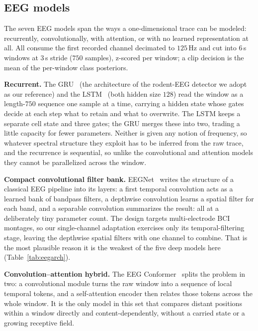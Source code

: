 \subsection{EEG models}
\label{sec:arch:eeg}
The seven EEG models span the ways a one-dimensional trace can be modeled:
recurrently, convolutionally, with attention, or with no learned representation at
all. All consume the first recorded channel decimated to $125$\,Hz and cut into
$6$\,s windows at $3$\,s stride ($750$ samples), z-scored per window; a clip
decision is the mean of the per-window class posteriors.

\noindent\textbf{Recurrent.}
The GRU~\cite{ganguly2025} (the architecture of the rodent-EEG detector we adopt as
our reference) and the LSTM~\cite{hochreiter1997lstm} (both hidden size $128$) read
the window as a length-$750$ sequence one sample at a time, carrying a hidden state
whose gates decide at each step what to retain and what to overwrite. The LSTM keeps
a separate cell state and three gates; the GRU merges these into two, trading a
little capacity for fewer parameters. Neither is given any notion of frequency, so
whatever spectral structure they exploit has to be inferred from the raw trace, and
the recurrence is sequential, so unlike the convolutional and attention models they
cannot be parallelized across the window.

\noindent\textbf{Compact convolutional filter bank.}
EEGNet~\cite{lawhern2018eegnet} writes the structure of a classical EEG pipeline into
its layers: a first temporal convolution acts as a learned bank of bandpass filters,
a depthwise convolution learns a spatial filter for each band, and a separable
convolution summarizes the result: all at a deliberately tiny parameter count. The
design targets multi-electrode BCI montages, so our single-channel adaptation
exercises only its temporal-filtering stage, leaving the depthwise spatial filters
with one channel to combine. That is the most plausible reason it is the weakest of
the five deep models here (Table~\ref{tab:eegarch}).

\noindent\textbf{Convolution--attention hybrid.}
The EEG Conformer~\cite{song2022conformer} splits the problem in two: a convolutional
module turns the raw window into a sequence of local temporal tokens, and a
self-attention encoder then relates those tokens across the whole window. It is the
only model in this set that compares distant positions within a window directly and
content-dependently, without a carried state or a growing receptive
field.

